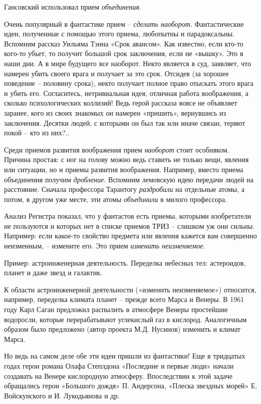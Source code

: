 \documentclass[11pt,a4paper]{article}
\begin{document}
Гансовский использовал прием \emph{объединения}.

Очень популярный в фантастике прием -- \emph{сделать наоборот}. Фантастические
идеи, полученные с помощью этого приема, любопытны и парадоксальны. Вспомним
рассказ Уильяма Тэнна «Срок авансом». Как известно, если кто-то кого-то убьет,
то получит большой срок заключения, если не «вышку». Это в наши дни. А в мире
будущего все наоборот. Некто является в суд, заявляет, что намерен убить
своего врага и получает за это срок. Отсидев (за хорошее поведение -- половину
срока), некто получает полное право отыскать этого врага и убить его.
Согласитесь, нетривиальная идея, отличная работа воображения, а сколько
психологических коллизий! Ведь герой рассказа вовсе не объявляет заранее, кого
из своих знакомых он намерен «пришить», вернувшись из заключения. Десятки
людей, с которыми он был так или иначе связан, теряют покой -- кто из них?..

Среди приемов развития воображения прием \emph{наоборот} стоит особняком.
Причина простая: с ног на голову можно ведь ставить не только вещи, явления
или ситуации, но и приемы развития воображения. Например, вместо приема
объединения получим \emph{дробление}. Вспомним лемовскую идею передачи людей
на расстояние. Сначала профессора Тарантогу \emph{раздробили} на отдельные
атомы, а потом, в другом уже месте, эти атомы \emph{объединили} в милого
профессора.

Анализ Регистра показал, что у фантастов есть приемы, которыми изобретатели не
пользуются и которых нет в списке приемов ТРИЗ -- слишком уж они сильны.
Например: если какое-то свойство предмета или явления кажется вам совершенно
неизменным, -- измените его. Это прием \emph{изменить неизменяемое}.

Пример: астроинженерная деятельность. Переделка небесных тел: астероидов,
планет и даже звезд и галактик.

К области астроинженерной деятельности («изменить неизменяемое») относится,
например, переделка климата планет -- прежде всего Марса и Венеры. В 1961 году
Карл Саган предложил распылить в атмосфере Венеры простейшие водоросли,
которые перерабатывают углекислый газ в кислород. Аналогичным образом было
предложено (автор проекта М.Д. Нусинов) изменить и климат Марса.

Но ведь на самом деле обе эти идеи пришли из фантастики! Еще в тридцатых годах
герои романа Олафа Степлдона «Последние и первые люди» начали создавать на
Венере кислородную атмосферу. Впоследствии к этой задаче обращались герои
«Большого дождя» П. Андерсона, «Плеска звездных морей» Е. Войскунского и
И. Лукодьянова и др.
\end{document}
